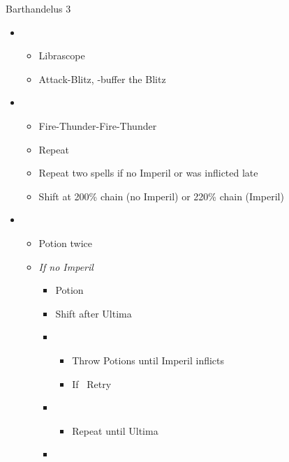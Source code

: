 \begin{battle}{Barthandelus 3}
  \begin{multicols}{2}
    \begin{itemize}
      \item \second
            \begin{itemize}
              \item Librascope
              \item Attack-Blitz, \rav-buffer the Blitz
            \end{itemize}
      \item \fifth
            \begin{itemize}
              \item Fire-Thunder-Fire-Thunder
              \item Repeat
              \item Repeat two spells if no Imperil or was inflicted late
              \item Shift at 200\% chain (no Imperil) or 220\% chain (Imperil)
            \end{itemize}
      \item \third
            \begin{itemize}
              \item Potion twice
              \item \textit{If no Imperil}
                    \begin{itemize}
                      \item Potion
                      \item Shift after Ultima
                      \item \fifth
                            \begin{itemize}
                              \item Throw Potions until Imperil inflicts
                              \item If \stagger\ Retry
                            \end{itemize}
                      \item \first
                            \begin{itemize}
                              \item Repeat until Ultima
                            \end{itemize}
                      \item \third
                            \begin{itemize}

\end{itemize}
\end{itemize}
\end{itemize}
\end{itemize}
\end{multicols}
\end{battle}
